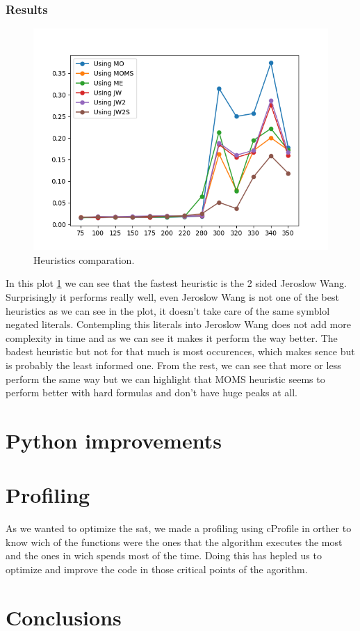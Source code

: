 \documentclass{article}
\begin{document}
\subsubsection{Results}
\begin{figure}[H]
  \includegraphics[width=\linewidth]{../utils/plots/heuristics.png}
  \caption{Heuristics comparation.}
  \label{fig:heu}
\end{figure}
In this plot \ref{fig:heu} we can see that the fastest heuristic is the 2 sided Jeroslow Wang. Surprisingly it performs really well, even Jeroslow Wang is not one of the best heuristics as we can see in the plot, it doesn't take care of the same symblol negated literals. Contempling this literals into Jeroslow Wang does not add more complexity in time and as we can see it makes it perform the way better.
The badest heuristic but not for that much is most occurences, which makes sence but is probably the least informed one. 
From the rest, we can see that more or less perform the same way but we can highlight that MOMS heuristic seems to perform better with hard formulas and don't have huge peaks at all.
\section{Python improvements}
%
\section{Profiling}
%
As we wanted to optimize the sat, we made a profiling using cProfile in orther to know wich of the functions were the ones that the algorithm executes the most and the ones in wich spends most of the time. Doing this has hepled us to optimize and improve the code in those critical points of the agorithm.
\section{Conclusions}
\end{document}
